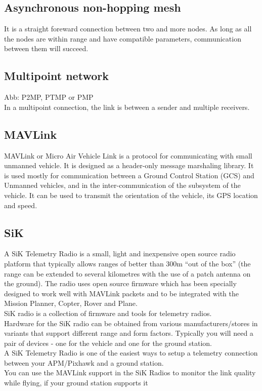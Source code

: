\subsection{Asynchronous non-hopping mesh}
It is a straight foreward connection between two and more nodes. As long as all the nodes are within range and have compatible parameters, communication between them will succeed.
%
%
\subsection{Multipoint network}
Abb: P2MP, PTMP or PMP\\
In a multipoint connection, the link is between a sender and multiple receivers. 
%
%
\subsection{MAVLink}
MAVLink or Micro Air Vehicle Link is a protocol for communicating with small unmanned vehicle. It is designed as a header-only message marshaling library. It is used mostly for communication between a Ground Control Station (GCS) and Unmanned vehicles, and in the inter-communication of the subsystem of the vehicle. It can be used to transmit the orientation of the vehicle, its GPS location and speed.
%
%
\subsection{SiK}
A SiK Telemetry Radio is a small, light and inexpensive open source radio platform that typically allows ranges of better than 300m “out of the box” (the range can be extended to several kilometres with the use of a patch antenna on the ground). The radio uses open source firmware which has been specially designed to work well with MAVLink packets and to be integrated with the Mission Planner, Copter, Rover and Plane.\\
SiK radio is a collection of firmware and tools for telemetry radios.\\
Hardware for the SiK radio can be obtained from various manufacturers/stores in variants that support different range and form factors. Typically you will need a pair of devices - one for the vehicle and one for the ground station. \\
A SiK Telemetry Radio is one of the easiest ways to setup a telemetry connection between your APM/Pixhawk and a ground station.\\
You can use the MAVLink support in the SiK Radios to monitor the link quality while flying, if your ground station supports it
